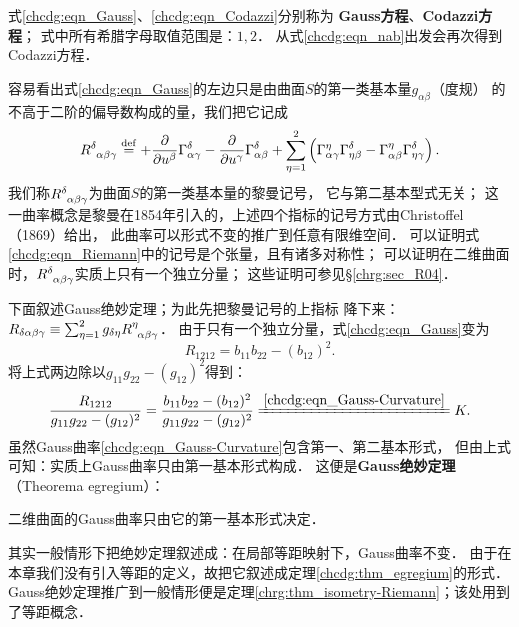 式\eqref{chcdg:eqn_Gauss}、\eqref{chcdg:eqn_Codazzi}分别称为
{\bfseries\heiti Gauss方程}、{\bfseries\heiti Codazzi方程}；
式中所有希腊字母取值范围是：$1,2$．
从式\eqref{chcdg:eqn_nab}出发会再次得到Codazzi方程．


容易看出式\eqref{chcdg:eqn_Gauss}的左边只是由曲面$S$的第一类基本量$g_{\alpha \beta}$（度规）
的不高于二阶的偏导数构成的量，我们把它记成
\begin{equation}\label{chcdg:eqn_Riemann}
    R_{\hphantom{\delta} \alpha \beta \gamma}^\delta \overset{\mathrm {def}}{=}
    +\frac{\partial}{\partial u^\beta} \Gamma_{\alpha \gamma}^\delta
    -\frac{\partial}{\partial u^\gamma} \Gamma_{\alpha \beta}^\delta
    +\sum_{\eta=1}^{2}\left( \Gamma_{\alpha \gamma}^\eta \Gamma_{\eta \beta}^\delta
    -\Gamma_{\alpha \beta}^\eta \Gamma_{\eta \gamma}^\delta \right) .
\end{equation}
我们称$R_{\hphantom{\delta} \alpha \beta \gamma}^\delta$为曲面$S$的第一类基本量的{\heiti 黎曼记号}，
它与第二基本型式无关；
这一曲率概念是黎曼在1854年引入的，上述四个指标的记号方式由Christoffel（1869）给出，
此曲率可以形式不变的推广到任意有限维空间．
可以证明式\eqref{chcdg:eqn_Riemann}中的记号是个张量，且有诸多对称性；
可以证明在二维曲面时，$R_{\hphantom{\delta} \alpha \beta \gamma}^\delta$实质上只有一个独立分量；
这些证明可参见\S\ref{chrg:sec_R04}．

下面叙述Gauss绝妙定理；为此先把黎曼记号的上指标
降下来：$R_{\delta \alpha \beta \gamma}\equiv \sum_{\eta=1}^{2} 
g_{\delta \eta}R_{\hphantom{\delta} \alpha \beta \gamma}^\eta$．
由于只有一个独立分量，式\eqref{chcdg:eqn_Gauss}变为
\begin{equation}
    R_{1212}= b_{11} b_{22} - (b_{12})^2 .
\end{equation}
将上式两边除以$g_{11} g_{22} -(g_{12})^2$得到：
\begin{equation}\label{chcdg:eqn_RK2}
    \frac{R_{1212}}{g_{11} g_{22} -(g_{12})^2}= \frac{b_{11} b_{22} -(b_{12})^2}{g_{11} g_{22} -(g_{12})^2}
    \xlongequal{\ref{chcdg:eqn_Gauss-Curvature}} K  .
\end{equation}
虽然Gauss曲率\eqref{chcdg:eqn_Gauss-Curvature}包含第一、第二基本形式，
但由上式可知：实质上Gauss曲率只由第一基本形式构成．
这便是{\heiti \bfseries Gauss绝妙定理}（Theorema egregium）：

\begin{theorem}\label{chcdg:thm_egregium}
    二维曲面的Gauss曲率只由它的第一基本形式决定．
\end{theorem}


其实一般情形下把绝妙定理叙述成：在局部等距映射下，Gauss曲率不变．
由于在本章我们没有引入等距的定义，故把它叙述成定理\ref{chcdg:thm_egregium}的形式．
Gauss绝妙定理推广到一般情形便是定理\ref{chrg:thm_isometry-Riemann}；该处用到了等距概念．


